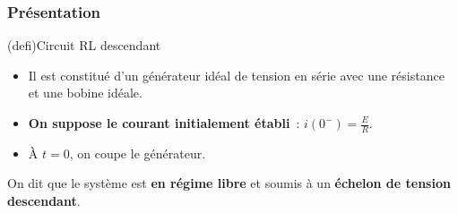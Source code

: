 \documentclass[../../main/main.tex]{subfiles}
\begin{document}
\subsubsection{Présentation}
\begin{tcb*}[sidebyside, righthand ratio=.30](defi){Circuit RL descendant}
	\begin{itemize}
		\item Il est constitué d'un générateur idéal de tension en série avec une
		      résistance et une bobine idéale.
		\item \textbf{On suppose le courant initialement établi}~: $i(0^-) =
			      \frac{E}{R}$.
		\item À $t=0$, on coupe le générateur.
	\end{itemize}
	On dit que le système est \textbf{en régime libre} et soumis à un
	\textbf{échelon de tension descendant}.
	\tcblower
	\begin{center}
\end{center}
\end{tcb*}
\end{document}
